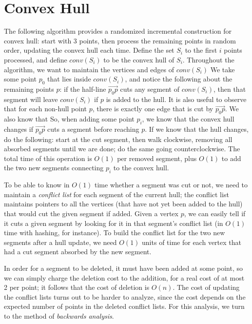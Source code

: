 \documentclass{article}
\begin{document}
\section{Convex Hull}
The following algorithm provides a randomized incremental construction for convex hull: start with 3 points, 
then process the remaining points in random order, updating the convex hull each time.  Define the set $S_{i}$ 
to the first $i$ points processed, and define $conv(S_{i})$ to be the convex hull of $S_{i}$.  Throughout the algorithm, 
we want to maintain the vertices and edges of $conv(S_{i})$  We take some point $p_{0}$ that lies inside $conv(S_{i})$, 
and notice the following about the remaining points $p$: if the half-line $\overrightarrow{p_{0}p}$ cuts any segment 
of $conv(S_{i})$, then that segment will leave $conv(S_{i})$ if $p$ is added to the hull.  It is also useful to observe that 
for each non-hull point $p$, there is exactly one edge that is cut by $\overrightarrow{p_{0}p}$.  We also know that So, when 
adding some point $p_{i}$, we know that the convex hull changes if $\overrightarrow{p_{0}p}$ cuts a segment before reaching $p$.  
If we know that the hull changes, do the following: start at the cut segment, then walk clockwise, removing all absorbed segments 
until we are done; do the same going counterclockwise.  The total time of this operation is $O(1)$ per removed segment, 
plus $O(1)$ to add the two new segments connecting $p_{i}$ to the convex hull.

To be able to know in $O(1)$ time whether a segment was cut or not, we need to maintain a \emph{conflict list} for each segment 
of the current hull; the conflict list maintains pointers to all the vertices (that have not yet been added to the hull) that 
would cut the given segment if added.  Given a vertex $p$, we can easily tell if it cuts a given segment by looking for it in that 
segment's conflict list (in $O(1)$ time with hashing, for instance).  To build the conflict list for the two new segments after a 
hull update, we need $O(1)$ units of time for each vertex that had a cut segment absorbed by the new segment.

In order for a segment to be deleted, it must have been added at some point, so we can simply charge the deletion cost to the addition, 
for a real cost of at most 2 per point; it follows that the cost of deletion is $O(n)$.  The cost of updating the conflict lists turns out 
to be harder to analyze, since the cost depends on the expected number of points in the deleted conflict lists.  For this analysis, we turn 
to the method of \emph{backwards analysis}.
\end{document}
